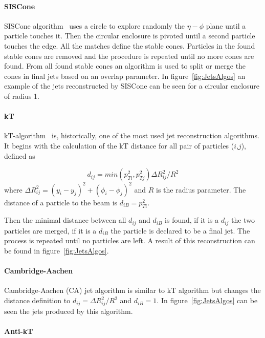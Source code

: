\paragraph{SISCone}

SISCone algorithm~\cite{Salam:2007xv} uses a circle to explore randomly the $\eta-\phi$ plane until a particle touches it. Then the circular enclosure is pivoted until a second particle touches the edge. All the matches define the stable cones. Particles in the found stable cones are removed and the procedure is repeated until no more cones are found. From all found stable cones an algorithm is used to split or merge the cones in final jets based on an overlap parameter. In figure~\ref{fig:JetsAlgos} an example of the jets reconstructed by SISCone can be seen for a circular enclosure of radius 1. 

\paragraph{kT}

kT-algorithm~\cite{Ellis:1993tq} is, historically, one of the most used jet reconstruction algorithms. It begins with the calculation of the kT distance for all pair of particles ($i$,$j$), defined as

\begin{equation}
  \label{eq:kt}
  d_{ij}=min(p_{Ti}^{2},p_{Tj}^{2})\Delta R_{ij}^{2}/R^{2}
\end{equation} where $\Delta R_{ij}^{2}=(y_{i}-y_{j})^{2}+(\phi_{i}-\phi_{j})^{2}$ and $R$ is the radius parameter. The distance of a particle to the beam is $d_{iB}=p_{Ti}^{2}$. 

Then the minimal distance between all $d_{ij}$ and $d_{iB}$ is found, if it is a $d_{ij}$ the two particles are merged, if it is a $d_{iB}$ the particle is declared to be a final jet. The process is repeated until no particles are left. A result of this reconstruction can be found in figure~\ref{fig:JetsAlgos}. 

\paragraph{Cambridge-Aachen}

Cambridge-Aachen (CA) jet algorithm is similar to kT algorithm but changes the distance definition to $d_{ij}=\Delta R_{ij}^{2}/R^{2}$ and $d_{iB}=1$. In figure~\ref{fig:JetsAlgos} can be seen the jets produced by this algorithm.

\paragraph{Anti-kT}

